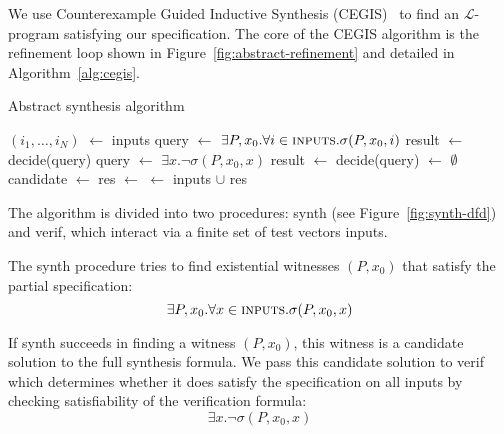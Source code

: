 \documentclass[preprint]{sigplanconf}
\theoremstyle{definition}
\newcommand*\Let[2]{\State #1 $\gets$ #2}
\begin{document}
We use Counterexample Guided Inductive Synthesis
(CEGIS)~\cite{lezama-thesis,sketch, DBLP:conf/iclp/BrainCVF06} to find an
$\mathcal{L}$-program satisfying our specification.  The core of the CEGIS
algorithm is the refinement loop shown in Figure~\ref{fig:abstract-refinement}
and detailed in Algorithm~\ref{alg:cegis}.

\begin{algorithm}
{\small
 \caption{Abstract synthesis algorithm
 \label{alg:cegis}}
 \begin{algorithmic}[1]
 \Statex
{}
  \Let{$(i_1, \ldots, i_N)$}{{\sc inputs}}
  \Let{query}{$\exists P, x_0 . \forall i \in \text{\sc inputs} . \sigma(P, x_0, i)$}
  \Let{result}{decide(query)}
    \State {}
  \Else
    \State {}
  \EndIf
\EndFunction
\Statex
{}
  \Let{query}{$\exists x . \lnot \sigma(P, x_0, x)$}
  \Let{result}{decide(query)}
    \State {}
  \Else
    \State {}
  \EndIf
\EndFunction
\columnbreak
\Statex
{}
  \Let{{\sc inputs}}{$\emptyset$}
  \Loop
    \Let{candidate}{}
      \State {}
    \EndIf
    \Let{res}{}
      \State {}
    \Else
      \Let{{\sc inputs}}{{\sc inputs} $\cup$ res}
    \EndIf
  \EndLoop
\EndFunction
 \end{algorithmic}
 }
\end{algorithm}

The algorithm is divided into two procedures: {\sc synth} (see Figure~\ref{fig:synth-dfd}) and {\sc
verif}, which interact via a finite set of test vectors {\sc inputs}.

The {\sc synth} procedure tries to find existential witnesses $(P, x_0)$
that satisfy the partial specification:
%
\[
 \exists P, x_0 . \forall x \in \text{\sc inputs} . \sigma(P, x_0, x)
\]

If {\sc synth} succeeds in finding a witness $(P, x_0)$, this witness is a
candidate solution to the full synthesis formula.  We pass this candidate
solution to {\sc verif} which determines whether it does satisfy
the specification on all inputs by checking satisfiability of the
verification formula:
%
\[
 \exists x . \lnot \sigma(P, x_0, x)
\]
\end{document}
